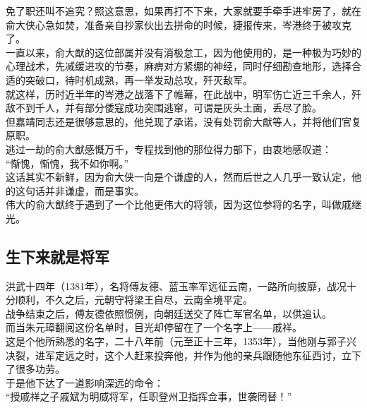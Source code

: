 \begin{multicols}{\theparacolNo}
免了职还叫不追究？照这意思，如果再打不下来，大家就要手牵手进牢房了，就在俞大侠心急如焚，准备亲自抄家伙出去拼命的时候，捷报传来，岑港终于被攻克了。\\

一直以来，俞大猷的这位部属并没有消极怠工，因为他使用的，是一种极为巧妙的心理战术，先减缓进攻的节奏，麻痹对方紧绷的神经，同时仔细勘查地形，选择合适的突破口，待时机成熟，再一举发动总攻，歼灭敌军。\\

就这样，历时近半年的岑港之战落下了帷幕，在此战中，明军伤亡近三千余人，歼敌不到千人，并有部分倭寇成功突围逃窜，可谓是灰头土面，丢尽了脸。\\

但嘉靖同志还是很够意思的，他兑现了承诺，没有处罚俞大猷等人，并将他们官复原职。\\

逃过一劫的俞大猷感慨万千，专程找到他的那位得力部下，由衷地感叹道：\\

“惭愧，惭愧，我不如你啊。”\\

这话其实不新鲜，因为俞大侠一向是个谦虚的人，然而后世之人几乎一致认定，他的这句话并非谦虚，而是事实。\\

伟大的俞大猷终于遇到了一个比他更伟大的将领，因为这位参将的名字，叫做戚继光。\\

\subsection{生下来就是将军}
洪武十四年（1381年），名将傅友德、蓝玉率军远征云南，一路所向披靡，战况十分顺利，不久之后，元朝守将梁王自尽，云南全境平定。\\

战争结束之后，傅友德依照惯例，向朝廷送交了阵亡军官名单，以供追认。\\

而当朱元璋翻阅这份名单时，目光却停留在了一个名字上——戚祥。\\

这是个他所熟悉的名字，二十八年前（元至正十三年，1353年），当他刚与郭子兴决裂，进军定远之时，这个人赶来投奔他，并作为他的亲兵跟随他东征西讨，立下了很多功劳。\\

于是他下达了一道影响深远的命令：\\

“授戚祥之子戚斌为明威将军，任职登州卫指挥佥事，世袭罔替！”\\


\end{multicols}
